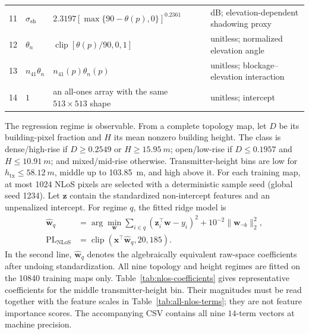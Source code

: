 \documentclass[10pt,conference]{IEEEtran}
\begin{document}
\begin{table}[!t]
\begin{tabularx}{\textwidth}{c l X l}
11 & $\sigma_{\mathrm{sh}}$ & $2.3197[\max\{90-\theta(p),0\}]^{0.2361}$ & \si{dB}; elevation-dependent shadowing proxy \\
12 & $\theta_n$ & $\operatorname{clip}[\theta(p)/90,0,1]$ & unitless; normalized elevation angle \\
13 & $n_{41}\theta_n$ & $n_{41}(p)\theta_n(p)$ & unitless; blockage--elevation interaction \\
14 & $1$ & an all-ones array with the same $513\times513$ shape & unitless; intercept \\
\bottomrule
\end{tabularx}
\end{table}

The regression regime is observable. From a complete topology map, let $D$ be
its building-pixel fraction and $H$ its mean nonzero building height. The class
is dense/high-rise if $D\ge0.2549$ or $H\ge\SI{15.95}{m}$; open/low-rise if
$D\le0.1957$ and $H\le\SI{10.91}{m}$; and mixed/mid-rise otherwise.
Transmitter-height bins are low for $h_{\mathrm{tx}}\le\SI{58.12}{m}$,
middle up to \SI{103.85}{m}, and high above it. For each training map, at most
1024 NLoS pixels are selected with a deterministic sample seed (global seed
1234). Let $\mathbf z$ contain the standardized non-intercept features and an
unpenalized intercept. For regime $q$, the fitted ridge model is
\begin{equation}
\begin{aligned}
\hat{\mathbf w}_{q}&=\arg\min_{\mathbf w}
\sum_{i\in q}(\mathbf z_i^{\top}\mathbf w-y_i)^2
+10^{-2}\|\mathbf w_{\neg b}\|_2^2,\\
\mathrm{PL}_{\mathrm{NLoS}}&=\operatorname{clip}
(\mathbf x^{\top}\hat{\mathbf w}_q,20,185).
\end{aligned}
\label{eq:nlos}
\end{equation}
In the second line, $\hat{\mathbf w}_q$ denotes the algebraically equivalent
raw-space coefficients after undoing standardization. All nine topology and
height regimes are fitted on the 10840 training maps only.
Table~\ref{tab:nlos-coefficients} gives representative coefficients for the
middle transmitter-height bin. Their magnitudes must be read together with the
feature scales in Table~\ref{tab:all-nlos-terms}; they are not feature
importance scores. The accompanying CSV contains all nine $14$-term vectors at
machine precision.
\end{document}
